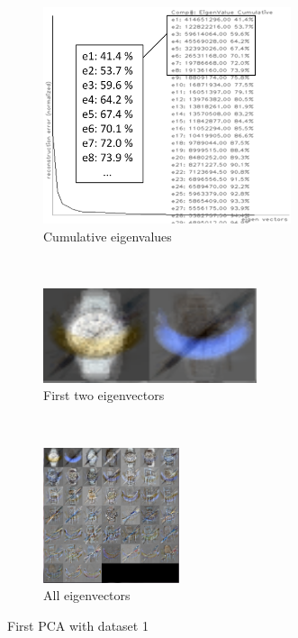 \documentclass[a4paper,10pt]{article}
\begin{document}
\begin{figure}[H]
\centering
     \begin{subfigure}[t]{0.3\textwidth}
      \centering
      \includegraphics[width=0.8\textwidth]{pictures/eigenvalue_dataset1}
      \caption{Cumulative eigenvalues}
      \label{fig:eigenvalue_dataset1}
    \end{subfigure}%
    ~
    \begin{subfigure}[t]{0.3\textwidth}
      \centering
      \includegraphics[width=\textwidth]{pictures/eigenvector_1}
      \caption{First two eigenvectors}
      \label{fig:eigenvector_1}
     \end{subfigure}
      ~
    \begin{subfigure}[t]{0.3\textwidth}
      \centering
      \includegraphics[width=4cm]{pictures/eigenvectors}
      \caption{All eigenvectors}
      \label{fig:eigenvectors}
     \end{subfigure}
     \caption{First PCA with dataset 1}
     \label{fig:PCA}
\end{figure}
\end{document}

